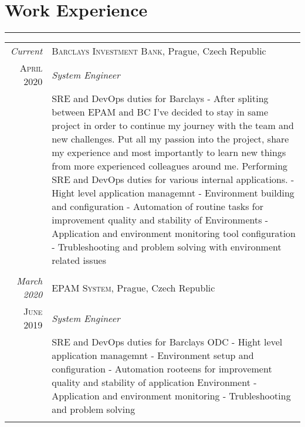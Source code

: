 \documentclass[a4paper,10pt]{article}
\begin{document}
\section*{Work Experience}
\vspace{-0.5ex}%
\rule{\textwidth}{0.3pt}
\vspace{-0.5ex}%
\begin{longtable}{r|p{11cm}}
\emph{Current} & \textsc{Barclays Investment Bank}, Prague, Czech Republic\\
\textsc{April 2020} & \emph{System Engineer}\\ 
& \footnotesize{\textnormal{SRE and DevOps duties for Barclays\newline
- After spliting between EPAM and BC I’ve decided to stay in same project in order to
continue my journey with the team and new challenges. Put all my passion into the project,
share my experience and most importantly to learn new things from more experienced
colleagues around me. Performing SRE and DevOps duties for various internal applications.
- Hight level application managemnt\newline
- Environment building and configuration\newline
- Automation of routine tasks for improvement quality and stability of Environments\newline
- Application and environment monitoring tool configuration\newline
- Trubleshooting and problem solving with environment related issues}}\\
\multicolumn{2}{c}{} \\
  \emph{March 2020} & \textsc{EPAM System}, Prague, Czech Republic \\
\textsc{June 2019} & \emph{System Engineer}\\ 
& \footnotesize{\textnormal{SRE and DevOps duties for Barclays ODC\newline
- Hight level application managemnt\newline
- Environment setup and configuration\newline
- Automation rooteens for improvement quality and stability of application Environment\newline
- Application and environment monitoring\newline
- Trubleshooting and problem solving}}\\
\multicolumn{2}{c}{} \\

\end{longtable}
\end{document}
